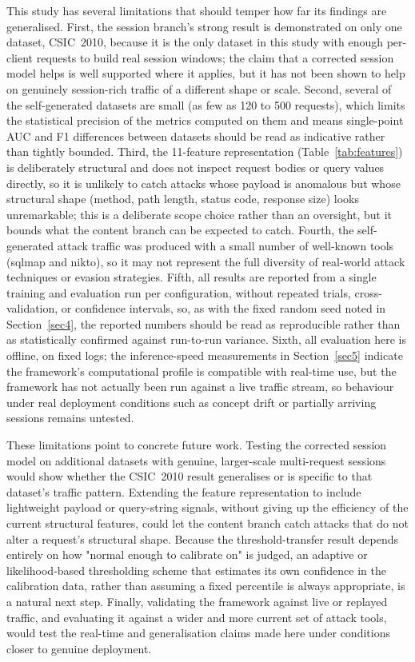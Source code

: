 \documentclass[futureinternet,article,submit,moreauthors]{Definitions/mdpi}
\begin{document}
This study has several limitations that should temper how far its findings are generalised. First, the session branch's strong result is demonstrated on only one dataset, CSIC~2010, because it is the only dataset in this study with enough per-client requests to build real session windows; the claim that a corrected session model helps is well supported where it applies, but it has not been shown to help on genuinely session-rich traffic of a different shape or scale. Second, several of the self-generated datasets are small (as few as 120 to 500 requests), which limits the statistical precision of the metrics computed on them and means single-point AUC and F1 differences between datasets should be read as indicative rather than tightly bounded. Third, the 11-feature representation (Table~\ref{tab:features}) is deliberately structural and does not inspect request bodies or query values directly, so it is unlikely to catch attacks whose payload is anomalous but whose structural shape (method, path length, status code, response size) looks unremarkable; this is a deliberate scope choice rather than an oversight, but it bounds what the content branch can be expected to catch. Fourth, the self-generated attack traffic was produced with a small number of well-known tools (sqlmap and nikto), so it may not represent the full diversity of real-world attack techniques or evasion strategies. Fifth, all results are reported from a single training and evaluation run per configuration, without repeated trials, cross-validation, or confidence intervals, so, as with the fixed random seed noted in Section~\ref{sec4}, the reported numbers should be read as reproducible rather than as statistically confirmed against run-to-run variance. Sixth, all evaluation here is offline, on fixed logs; the inference-speed measurements in Section~\ref{sec5} indicate the framework's computational profile is compatible with real-time use, but the framework has not actually been run against a live traffic stream, so behaviour under real deployment conditions such as concept drift or partially arriving sessions remains untested.

These limitations point to concrete future work. Testing the corrected session model on additional datasets with genuine, larger-scale multi-request sessions would show whether the CSIC~2010 result generalises or is specific to that dataset's traffic pattern. Extending the feature representation to include lightweight payload or query-string signals, without giving up the efficiency of the current structural features, could let the content branch catch attacks that do not alter a request's structural shape. Because the threshold-transfer result depends entirely on how "normal enough to calibrate on" is judged, an adaptive or likelihood-based thresholding scheme that estimates its own confidence in the calibration data, rather than assuming a fixed percentile is always appropriate, is a natural next step. Finally, validating the framework against live or replayed traffic, and evaluating it against a wider and more current set of attack tools, would test the real-time and generalisation claims made here under conditions closer to genuine deployment.
\end{document}
